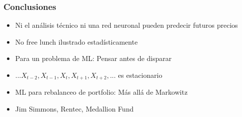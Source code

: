 \documentclass[t,9pt,pdftex]{beamer}
\begin{document}
\begin{frame}[c]
	\frametitle{Conclusiones}
	
		\begin{itemize}
		\item Ni el an\'alisis t\'ecnico ni una red neuronal pueden predecir futuros precios
		\item No free lunch ilustrado estad\'isticamente
		\item Para un problema de ML: Pensar antes de disparar
		\item $... X_{t-2}, X_{t-1}, X_{t}, X_{t+1}, X_{t+2}, ...$ es estacionario
		\item ML para rebalanceo de portfolio: M\'as all\'a de Markowitz
		\item Jim Simmons, Rentec, Medallion Fund
		\end{itemize}
	
\end{frame}



\end{document}
